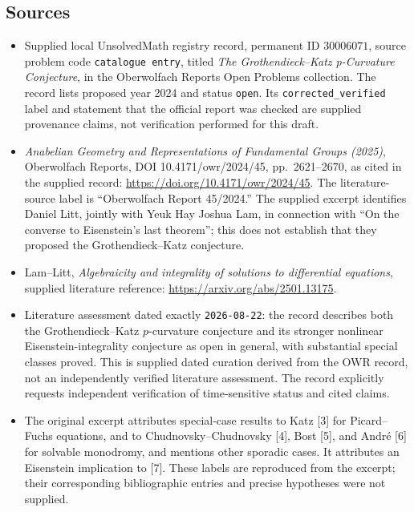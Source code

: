 \documentclass[11pt]{article}
\begin{document}
\subsection{Sources}
\begin{itemize}
\item Supplied local UnsolvedMath registry record, permanent ID \(30006071\), source problem code \texttt{catalogue entry}, titled \emph{The Grothendieck--Katz p-Curvature Conjecture}, in the Oberwolfach Reports Open Problems collection. The record lists proposed year 2024 and status \texttt{open}. Its \texttt{corrected\_verified} label and statement that the official report was checked are supplied provenance claims, not verification performed for this draft.
\item \emph{Anabelian Geometry and Representations of Fundamental Groups (2025)}, Oberwolfach Reports, DOI 10.4171/owr/2024/45, pp.~2621--2670, as cited in the supplied record: \url{https://doi.org/10.4171/owr/2024/45}. The literature-source label is ``Oberwolfach Report 45/2024.'' The supplied excerpt identifies Daniel Litt, jointly with Yeuk Hay Joshua Lam, in connection with ``On the converse to Eisenstein's last theorem''; this does not establish that they proposed the Grothendieck--Katz conjecture.
\item Lam--Litt, \emph{Algebraicity and integrality of solutions to differential equations}, supplied literature reference: \url{https://arxiv.org/abs/2501.13175}.
\item Literature assessment dated exactly \texttt{2026-08-22}: the record describes both the Grothendieck--Katz \(p\)-curvature conjecture and its stronger nonlinear Eisenstein-integrality conjecture as open in general, with substantial special classes proved. This is supplied dated curation derived from the OWR record, not an independently verified literature assessment. The record explicitly requests independent verification of time-sensitive status and cited claims.
\item The original excerpt attributes special-case results to Katz [3] for Picard--Fuchs equations, and to Chudnovsky--Chudnovsky [4], Bost [5], and Andr\'e [6] for solvable monodromy, and mentions other sporadic cases. It attributes an Eisenstein implication to [7]. These labels are reproduced from the excerpt; their corresponding bibliographic entries and precise hypotheses were not supplied.
\end{itemize}
\end{document}
